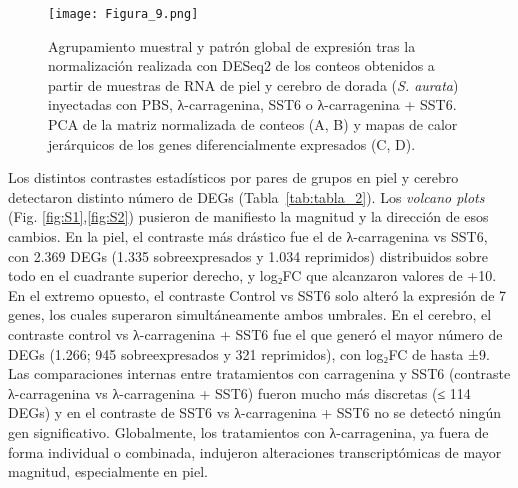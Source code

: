 \documentclass[10pt,a4paper]{article}
\begin{document}
\begin{figure}[ht]
  \centering
 \texttt{[image: Figura\_9.png]}
 
  \caption{Agrupamiento muestral y patrón global de expresión tras la normalización realizada con DESeq2 de los conteos obtenidos a partir de muestras de RNA de piel y cerebro de dorada (\textit{S. aurata}) inyectadas con PBS, λ-carragenina, SST6 o λ-carragenina + SST6. PCA de la matriz normalizada de conteos (A, B) y mapas de calor jerárquicos de los genes diferencialmente expresados (C, D).}
  \label{fig:9}
\end{figure}

Los distintos contrastes estadísticos por pares de grupos en piel y cerebro detectaron distinto número de DEGs (Tabla~\ref{tab:tabla_2}). Los \textit{volcano plots} (Fig. \ref{fig:S1},\ref{fig:S2}) pusieron de manifiesto la magnitud y la dirección de esos cambios. En la piel, el contraste más drástico fue el de λ-carragenina vs SST6, con 2.369 DEGs (1.335 sobreexpresados y 1.034 reprimidos) distribuidos sobre todo en el cuadrante superior derecho, y log₂FC que alcanzaron valores de +10. En el extremo opuesto, el contraste Control vs SST6 solo alteró la expresión de 7 genes, los cuales superaron simultáneamente ambos umbrales. En el cerebro, el contraste control vs λ-carragenina + SST6 fue el que generó el mayor número de DEGs (1.266; 945 sobreexpresados y 321 reprimidos), con log₂FC de hasta ±9. Las comparaciones internas entre tratamientos con carragenina y SST6 (contraste λ-carragenina vs λ-carragenina + SST6) fueron mucho más discretas (≤ 114 DEGs) y en el contraste de SST6 vs λ-carragenina + SST6 no se detectó ningún gen significativo. Globalmente, los tratamientos con λ-carragenina, ya fuera de forma individual o combinada, indujeron alteraciones transcriptómicas de mayor magnitud, especialmente en piel.
\end{document}
